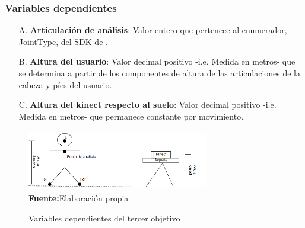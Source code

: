 \subsubsection{Variables dependientes} \label{vr:3o:dep}
\begin{enumerate}
	\item[A.] \textbf{Articulaci\'on de an\'alisis}: Valor entero que pertenece al  enumerador, JointType, del SDK de . 
	\item[B.] \textbf{Altura del usuario}: Valor decimal positivo -i.e. Medida en metros- que se determina a partir de los componentes de altura de las articulaciones de la cabeza y p\'ies del usuario.	 
	\item[C.] \textbf{Altura del kinect respecto al suelo}: Valor decimal positivo -i.e. Medida en metros- que permanece constante por movimiento. 
\end{enumerate}
\medbreak
\begin{figure}[H]
	\caption{Variables dependientes del tercer objetivo}
	\label{fig:vardep3}
	\centering
	\includegraphics[width=300px,height=100px]{graphics/var-3obj.png} \\
	\textbf{Fuente:}Elaboraci\'on propia 
\end{figure}
\medbreak

